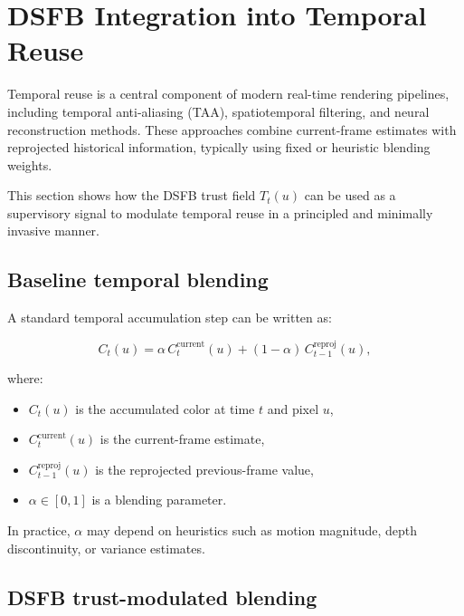 \documentclass[11pt,letterpaper]{article}
\theoremstyle{gcresult}
\theoremstyle{definition}
\begin{document}
\section{DSFB Integration into Temporal Reuse}
\label{sec:trg_integration}

Temporal reuse is a central component of modern real-time rendering pipelines, including temporal anti-aliasing (TAA), spatiotemporal filtering, and neural reconstruction methods. These approaches combine current-frame estimates with reprojected historical information, typically using fixed or heuristic blending weights.

This section shows how the DSFB trust field $T_t(u)$ can be used as a supervisory signal to modulate temporal reuse in a principled and minimally invasive manner.


\subsection{Baseline temporal blending}

A standard temporal accumulation step can be written as:

\begin{equation}
C_t(u) = \alpha \, C_t^{\mathrm{current}}(u) 
+ (1 - \alpha) \, C_{t-1}^{\mathrm{reproj}}(u),
\end{equation}

where:
\begin{itemize}[leftmargin=1.5em]
    \item $C_t(u)$ is the accumulated color at time $t$ and pixel $u$,
    \item $C_t^{\mathrm{current}}(u)$ is the current-frame estimate,
    \item $C_{t-1}^{\mathrm{reproj}}(u)$ is the reprojected previous-frame value,
    \item $\alpha \in [0,1]$ is a blending parameter.
\end{itemize}

In practice, $\alpha$ may depend on heuristics such as motion magnitude, depth discontinuity, or variance estimates.


\subsection{DSFB trust-modulated blending}
\end{document}
